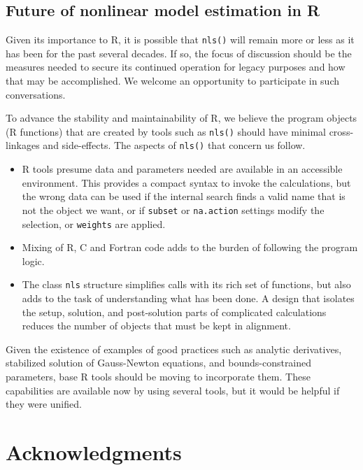 \documentclass[
]{article}
\begin{document}
\hypertarget{future-of-nonlinear-model-estimation-in-r}{%
\subsection{Future of nonlinear model estimation in
R}\label{future-of-nonlinear-model-estimation-in-r}}

Given its importance to R, it is possible that \texttt{nls()} will
remain more or less as it has been for the past several decades. If so,
the focus of discussion should be the measures needed to secure its
continued operation for legacy purposes and how that may be
accomplished. We welcome an opportunity to participate in such
conversations.

To advance the stability and maintainability of R, we believe the
program objects (R functions) that are created by tools such as
\texttt{nls()} should have minimal cross-linkages and side-effects. The
aspects of \texttt{nls()} that concern us follow.

\begin{itemize}
\item
  R tools presume data and parameters needed are available in an
  accessible environment. This provides a compact syntax to invoke the
  calculations, but the wrong data can be used if the internal search
  finds a valid name that is not the object we want, or if
  \texttt{subset} or \texttt{na.action} settings modify the selection,
  or \texttt{weights} are applied.
\item
  Mixing of R, C and Fortran code adds to the burden of following the
  program logic.
\item
  The class \texttt{nls} structure simplifies calls with its rich set of
  functions, but also adds to the task of understanding what has been
  done. A design that isolates the setup, solution, and post-solution
  parts of complicated calculations reduces the number of objects that
  must be kept in alignment.
\end{itemize}

Given the existence of examples of good practices such as analytic
derivatives, stabilized solution of Gauss-Newton equations, and
bounds-constrained parameters, base R tools should be moving to
incorporate them. These capabilities are available now by using several
tools, but it would be helpful if they were unified.

\hypertarget{acknowledgments}{%
\section{Acknowledgments}\label{acknowledgments}}
\end{document}
